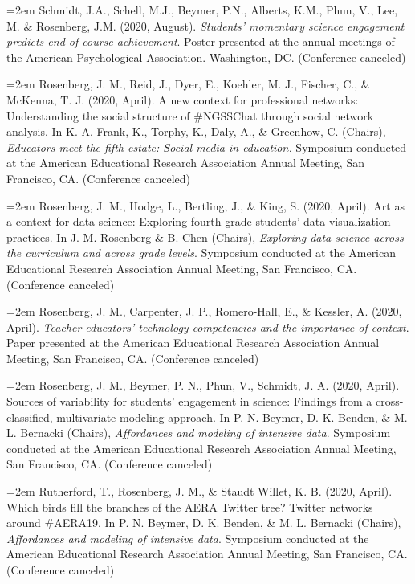\documentclass[
  14,
]{article}
\begin{document}
\hangindent=2em Schmidt, J.A., Schell, M.J., Beymer, P.N., Alberts,
K.M., Phun, V., Lee, M. \& Rosenberg, J.M. (2020, August).
\emph{Students' momentary science engagement predicts end-of-course
achievement}. Poster presented at the annual meetings of the American
Psychological Association. Washington, DC. (Conference canceled)

\hangindent=2em Rosenberg, J. M., Reid, J., Dyer, E., Koehler, M. J.,
Fischer, C., \& McKenna, T. J. (2020, April). A new context for
professional networks: Understanding the social structure of \#NGSSChat
through social network analysis. In K. A. Frank, K., Torphy, K., Daly,
A., \& Greenhow, C. (Chairs), \emph{Educators meet the fifth estate:
Social media in education.} Symposium conducted at the American
Educational Research Association Annual Meeting, San Francisco, CA.
(Conference canceled)

\hangindent=2em Rosenberg, J. M., Hodge, L., Bertling, J., \& King, S.
(2020, April). Art as a context for data science: Exploring fourth-grade
students' data visualization practices. In J. M. Rosenberg \& B. Chen
(Chairs), \emph{Exploring data science across the curriculum and across
grade levels}. Symposium conducted at the American Educational Research
Association Annual Meeting, San Francisco, CA. (Conference canceled)

\hangindent=2em Rosenberg, J. M., Carpenter, J. P., Romero-Hall, E., \&
Kessler, A. (2020, April). \emph{Teacher educators' technology
competencies and the importance of context}. Paper presented at the
American Educational Research Association Annual Meeting, San Francisco,
CA. (Conference canceled)

\hangindent=2em Rosenberg, J. M., Beymer, P. N., Phun, V., Schmidt, J.
A. (2020, April). Sources of variability for students' engagement in
science: Findings from a cross-classified, multivariate modeling
approach. In P. N. Beymer, D. K. Benden, \& M. L. Bernacki (Chairs),
\emph{Affordances and modeling of intensive data}. Symposium conducted
at the American Educational Research Association Annual Meeting, San
Francisco, CA. (Conference canceled)

\hangindent=2em Rutherford, T., Rosenberg, J. M., \& Staudt Willet, K.
B. (2020, April). Which birds fill the branches of the AERA Twitter
tree? Twitter networks around \#AERA19. In P. N. Beymer, D. K. Benden,
\& M. L. Bernacki (Chairs), \emph{Affordances and modeling of intensive
data}. Symposium conducted at the American Educational Research
Association Annual Meeting, San Francisco, CA. (Conference canceled)
\end{document}
